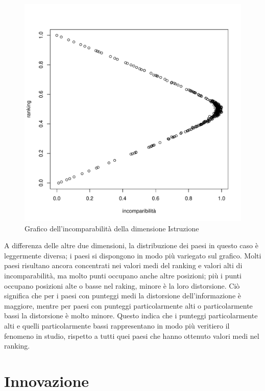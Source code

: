 \documentclass[a4paper,12pt, openright]{report}
\begin{document}
\begin{figure}[H]
    \centering
    \includegraphics[scale=.5]{plot_incom_ist.pdf}
    \caption{Grafico dell'incomparabilità della dimensione Istruzione}
\end{figure}

A differenza delle altre due dimensioni, la distribuzione dei paesi in questo caso è leggermente diversa; i paesi si dispongono in modo più variegato sul grafico. Molti 
paesi risultano ancora concentrati nei valori medi del ranking e valori alti di incomparabilità, ma molto punti occupano anche altre posizioni; più i punti occupano posizioni
alte o basse nel raking, minore è la loro distorsione. Ciò significa che per i paesi con punteggi medi la distorsione dell'informazione è maggiore, mentre per paesi con
punteggi particolarmente alti o particolarmente bassi la distorsione è molto minore. Questo indica che i punteggi particolarmente alti e quelli particolarmente bassi 
rappresentano in modo più veritiero il fenomeno in studio, rispetto a tutti quei paesi che hanno ottenuto valori medi nel ranking. 


\newpage


\section{Innovazione}
\end{document}
